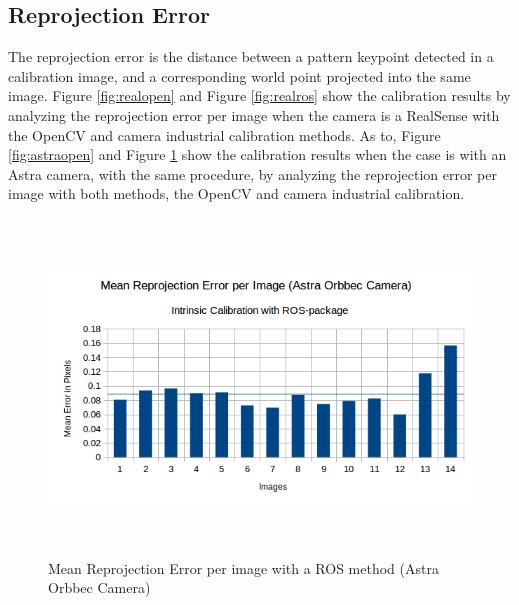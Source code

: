 \subsection{Reprojection Error}

The reprojection error is the distance between a pattern keypoint detected in a calibration image, and a corresponding world point projected into the same image. Figure \ref{fig:realopen} and Figure \ref{fig:realros} show the calibration results by analyzing the reprojection error per image when the camera is a RealSense with the OpenCV and camera \textunderscore industrial calibration methods. As to, Figure \ref{fig:astraopen} and Figure \ref{fig:astraros} show the calibration results when the case is with an Astra camera, with the same procedure, by analyzing the reprojection error per image with both methods, the OpenCV and camera \textunderscore industrial calibration.



\begin{figure}[!h]
\begin{center}
\includegraphics[width=5in, height=3.5in]{figures05/ros_int_cal_astra.png}
\caption{Mean Reprojection Error per image with a ROS method (Astra Orbbec Camera)}%
\label{fig:astraros}
\end{center}
\end{figure}

